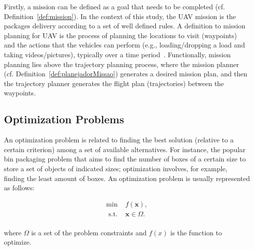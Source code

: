 \documentclass[conference]{IEEEtran}
\begin{document}
Firstly, a mission can be defined as a goal that needs to be completed (cf. Definition~\ref{def:mission}). In the context of this study, the UAV mission is the packages delivery according to a set of well defined rules. A definition to mission planning for UAV is the process of planning the locations to visit (waypoints) and the actions that the vehicles can perform (e.g., loading/dropping a load and taking videos/pictures), typically over a time period~\cite{ramirez2014solving}. Functionally, mission planning lies above the trajectory planning process, where the mission planner (cf. Definition~\ref{def:planejadorMissao}) generates a desired mission plan, and then the trajectory planner generates the flight plan (trajectories) between the waypoints.




\subsection{Optimization Problems}

An optimization problem is related to finding the best solution (relative to a certain criterion) among a set of available alternatives. For instance, the popular bin packaging problem that aims to find the number of boxes of a certain size to store a set of objects of indicated sizes; optimization involves, for example, finding the least amount of boxes. An optimization problem is usually represented as follows:

\begin{equation}
	\label{eq:optproblema}
	\begin{array}{cc}
		\min & f(\textbf{x}),  \\
		\textrm{ s.t. } & \textbf{x}\in\Omega.\\
	\end{array}
\end{equation}	

\noindent where $\Omega$ is a set of the problem constraints and $f(x)$ is the function to optimize.
	
\end{document}
